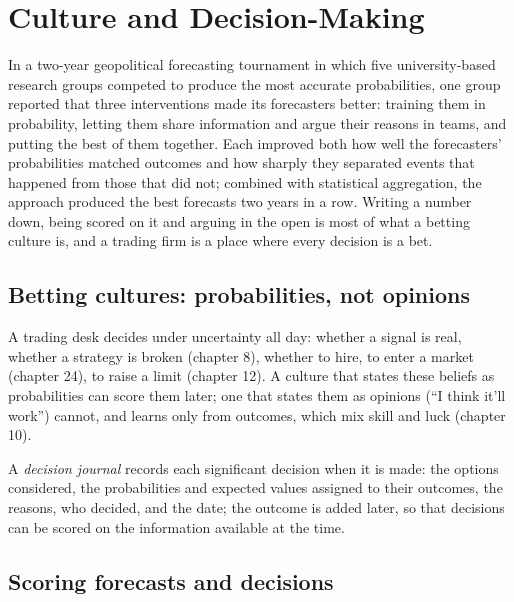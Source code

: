\chapter{Culture and Decision-Making}\label{ch:fm:culture-and-decision-making}

In a two-year geopolitical forecasting tournament in which five university-based research groups competed to produce the most accurate
probabilities, one group reported that three interventions made its forecasters better: training them in probability, letting them share
information and argue their reasons in teams, and putting the best of them together. Each improved both how well the forecasters' probabilities
matched outcomes and how sharply they separated events that happened from those that did not; combined with statistical aggregation, the approach
produced the best forecasts two years in a row. Writing a number down, being scored on it and arguing in the open is most of what a betting culture
is, and a trading firm is a place where every decision is a bet.

\section{Betting cultures: probabilities, not opinions}

A trading desk decides under uncertainty all day: whether a signal is real, whether a strategy is broken (chapter 8), whether to hire, to enter a
market (chapter 24), to raise a limit (chapter 12). A culture that states these beliefs as probabilities can score them later; one that states them
as opinions (``I think it'll work'') cannot, and learns only from outcomes, which mix skill and luck (chapter 10).

\begin{definition}\label{def:fm:culture-and-decision-making:journal}
A \emph{decision journal} records each significant decision when it is made: the options considered, the probabilities
and expected values assigned to their outcomes, the reasons, who decided, and the date; the outcome is added later, so that decisions can be
scored on the information available at the time.
\end{definition}

\section{Scoring forecasts and decisions}

